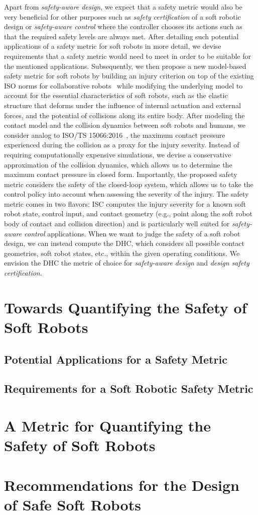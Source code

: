Apart from \emph{safety-aware design}, we expect that a safety metric would also be very beneficial for other purposes such as \emph{safety certification} of a soft robotic design or \emph{safety-aware control} where the controller chooses its actions such as that the required safety levels are always met.
After detailing such potential applications of a safety metric for soft robots in more detail, we devise requirements that a safety metric would need to meet in order to be suitable for the mentioned applications.
Subsequently, we then propose a new model-based safety metric for soft robots by building an injury criterion on top of the existing ISO norms for collaborative robots~\cite{Isots_15066_2016} while modifying the underlying model to account for the essential characteristics of soft robots, such as the elastic structure that deforms under the influence of internal actuation and external forces, and the potential of collisions along its entire body.
After modeling the contact model and the collision dynamics between soft robots and humans, we consider analog to ISO/TS 15066:2016~\cite{Isots_15066_2016}, the maximum contact pressure experienced during the collision as a proxy for the injury severity. Instead of requiring computationally expensive simulations, we devise a conservative approximation of the collision dynamics, which allows us to determine the maximum contact pressure in closed form.
Importantly, the proposed safety metric considers the safety of the closed-loop system, which allows us to take the control policy into account when assessing the severity of the injury.
The safety metric comes in two flavors: \gls{ISC} computes the injury severity for a known soft robot state, control input, and contact geometry (e.g., point along the soft robot body of contact and collision direction) and is particularly well suited for \emph{safety-aware control} applications. 
When we want to judge the safety of a soft robot design, we can instead compute the \gls{DHC}, which considers all possible contact geometries, soft robot states, etc., within the given operating conditions. We envision the \gls{DHC} the metric of choice for \emph{safety-aware design} and \emph{design safety certification}.

\section{Towards Quantifying the Safety of Soft Robots}
\subsection{Potential Applications for a Safety Metric}
\subsection{Requirements for a Soft Robotic Safety Metric}
\section{A Metric for Quantifying the Safety of Soft Robots}
\section{Recommendations for the Design of Safe Soft Robots}

